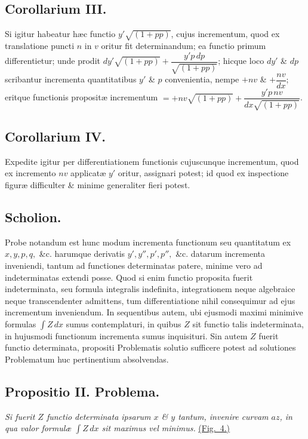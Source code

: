 \subsection*{Corollarium III.}
Si igitur habeatur hæc functio $y'\sqrt{(1+pp)}$, cujus incrementum, quod ex translatione puncti $n$ in $v$ oritur fit determinandum; ea functio primum differentietur; unde prodit $dy'\sqrt{(1+pp)}+\dfrac{y' p\,dp}{\sqrt{(1+pp)}}$; hicque loco $dy'$ \& $dp$ scribantur incrementa quantitatibus $y'$ \& $p$ convenientia, nempe $+nv$ \& $+\dfrac{nv}{dx}$; eritque functionis propositæ incrementum $=+nv\sqrt{(1+pp)}+\dfrac{y'p\,nv}{dx\sqrt{(1+pp)}}$.

\subsection*{Corollarium IV.}
Expedite igitur per differentiationem functionis cujuscunque incrementum, quod ex incremento $nv$ applicatæ $y'$ oritur, assignari potest; id quod ex inspectione figuræ difficulter \& minime generaliter fieri potest.

\subsection*{Scholion.}
Probe notandum est hunc modum incrementa functionum seu quantitatum ex $x,y,p,q,$ \&c. harumque derivatis $y',y'',p',p'',$ \&c. datarum incrementa inveniendi, tantum ad functiones determinatas patere, minime vero ad indeterminatas extendi posse. Quod si enim functio proposita fuerit indeterminata, seu formula integralis indefinita, integrationem neque algebraice neque transcendenter admittens, tum differentiatione nihil consequimur ad ejus incrementum inveniendum. In sequentibus autem, ubi ejusmodi maximi minimive formulas $\int Z\,dx$ sumus contemplaturi, in quibus $Z$ sit functio talis indeterminata, in hujusmodi functionum incrementa sumus inquisituri. Sin autem $Z$ fuerit functio determinata, propositi Problematis solutio sufficere potest ad solutiones Problematum huc pertinentium absolvendas.

\subsection*{Propositio II. Problema.}
\textit{Si fuerit $Z$ functio determinata ipsarum $x$ \& $y$ tantum, invenire curvam $az$, in qua valor formulæ $\int Z\,dx$ sit maximus vel minimus.} \hyperlink{fig:4}{(Fig.~4.)}

